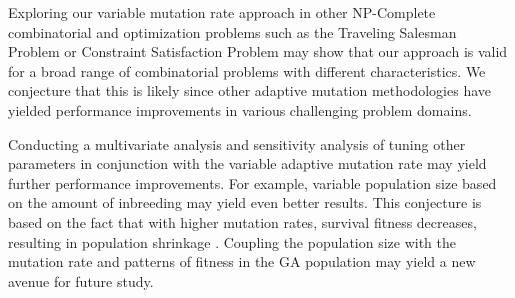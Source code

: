 \documentclass[conference]{IEEEtran}
\begin{document}
Exploring our variable mutation rate approach in other NP-Complete combinatorial and optimization problems such as the Traveling Salesman Problem or Constraint Satisfaction Problem may show that our approach is valid for a broad range of combinatorial problems with different characteristics. We conjecture that this is likely since other adaptive mutation methodologies have yielded performance improvements in various challenging problem domains.

Conducting a multivariate analysis and sensitivity analysis of tuning other parameters in conjunction with the variable adaptive mutation rate may yield further performance improvements. For example, variable population size based on the amount of inbreeding may yield even better results. This conjecture is based on the fact that with higher mutation rates, survival fitness decreases, resulting in population shrinkage \cite{cit:9}. Coupling the population size with the mutation rate and patterns of fitness in the GA population may yield a new avenue for future study.




%
%
%


\def\V{\rm vol.~}
\def\N{no.~}
\def\pp{pp.~}
\def\Pot{\it Proc. }
\def\IJCNN{\it IEEE World Congress On Computational Intelligence\rm }
\def\ACC{\it Beijing International Convention Center\rm }
\def\SMC{\it IEEE Trans. Systems\rm , \it Man\rm , and \it Cybernetics\rm } 
\end{document}
